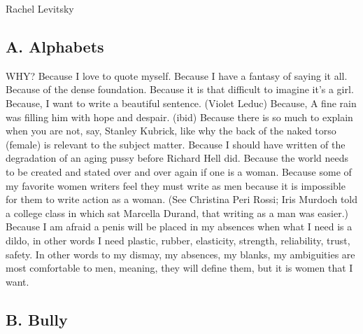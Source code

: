 Rachel Levitsky

\hypertarget{a.-alphabets}{%
\subsection{A. Alphabets}\label{a.-alphabets}}

WHY? Because I love to quote myself. Because I have a fantasy of saying
it all. Because of the dense foundation. Because it is that difficult to
imagine it's a girl. Because, I want to write a beautiful sentence.
(Violet Leduc) Because, A fine rain was filling him with hope and
despair. (ibid) Because there is so much to explain when you are not,
say, Stanley Kubrick, like why the back of the naked torso (female) is
relevant to the subject matter. Because I should have written of the
degradation of an aging pussy before Richard Hell did. Because the world
needs to be created and stated over and over again if one is a woman.
Because some of my favorite women writers feel they must write as men
because it is impossible for them to write action as a woman. (See
Christina Peri Rossi; Iris Murdoch told a college class in which sat
Marcella Durand, that writing as a man was easier.) Because I am afraid
a penis will be placed in my absences when what I need is a dildo, in
other words I need plastic, rubber, elasticity, strength, reliability,
trust, safety. In other words to my dismay, my absences, my blanks, my
ambiguities are most comfortable to men, meaning, they will define them,
but it is women that I want.

\hypertarget{b.-bully}{%
\subsection{B. Bully}\label{b.-bully}}

